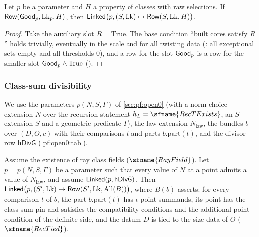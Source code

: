 \begin{lemma}\label{pf:sh-theta:linkedrow}
Let $p$ be a parameter and $H$ a property of classes with raw selections. If $\mathsf{Row}(\mathsf{Good}_p,\mathrm{Lk}_p,H)$,
then $\mathsf{Linked}\bigl(p,(S,\mathrm{Lk})\mapsto\mathsf{Row}(S,\mathrm{Lk},H)\bigr)$.
\end{lemma}

\begin{proof}
Take the auxiliary slot $R=\mathrm{True}$. The base condition ``built cores satisfy $R$'' holds trivially, eventually in the
scale and for all twisting data (: all exceptional sets empty and all
thresholds $0$), and a row for the slot $\mathsf{Good}_p$ is a row for the smaller slot $\mathsf{Good}_p\wedge\mathrm{True}$
().
\end{proof}

\subsubsection{Class-sum divisibility}

We use the parameters $p(N,S,\Gamma)$ of \cref{sec:pf:open0} (with a norm-choice extension $N$ over the recursion statement
$h_L=\sfname{RecTExists}$, an $S$-extension $S$ and a geometric predicate $\Gamma$), the law extension $N_{\mathrm{law}}$, the
bundles $b$ over $(D,O,c)$ with their comparisons $t$ and parts $b.\mathrm{part}(t)$, and the divisor row
$\mathsf{hDivG}$ (\cref{pf:open0:tab}).

\begin{theorem}\label{pf:sh-theta:classsum}
Assume the existence of ray class fields ($\sfname{RayField}$). Let $p=p(N,S,\Gamma)$ be a parameter such that every value of
$N$ at a point admits a value of $N_{\mathrm{law}}$, and assume $\mathsf{Linked}(p,\mathsf{hDivG})$. Then
$\mathsf{Linked}\bigl(p,(S',\mathrm{Lk})\mapsto\mathsf{Row}(S',\mathrm{Lk},\mathrm{All}(B))\bigr)$, where $B(b)$ asserts: for every
comparison $t$ of $b$, the part $b.\mathrm{part}(t)$ has $\iota$-point summands, its point has the class-sum pin and satisfies the
compatibility conditions and the additional point condition of the definite side, and the datum $D$ is tied to the size data of
$O$ ($\sfname{RecTied}$).
\end{theorem}

